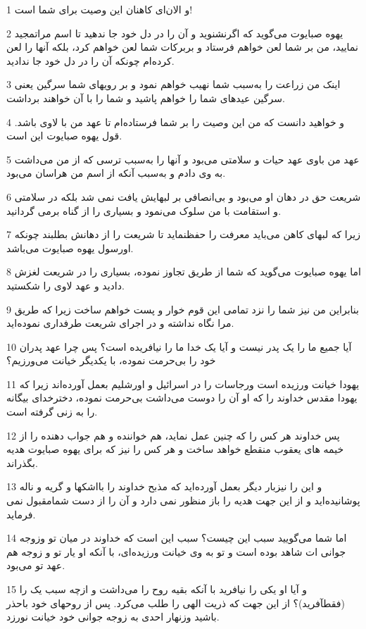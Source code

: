 \par 1 و الان‌ای کاهنان این وصیت برای شما است!
\par 2 یهوه صبایوت می‌گوید که اگرنشنوید و آن را در دل خود جا ندهید تا اسم مراتمجید نمایید، من بر شما لعن خواهم فرستاد و بربرکات شما لعن خواهم کرد، بلکه آنها را لعن کرده‌ام چونکه آن را در دل خود جا ندادید.
\par 3 اینک من زراعت را به‌سبب شما نهیب خواهم نمود و بر رویهای شما سرگین یعنی سرگین عیدهای شما را خواهم پاشید و شما را با آن خواهند برداشت.
\par 4 و خواهید دانست که من این وصیت را بر شما فرستاده‌ام تا عهد من با لاوی باشد. قول یهوه صبایوت این است.
\par 5 عهد من باوی عهد حیات و سلامتی می‌بود و آنها را به‌سبب ترسی که از من می‌داشت به وی دادم و به‌سبب آنکه از اسم من هراسان می‌بود.
\par 6 شریعت حق در دهان او می‌بود و بی‌انصافی بر لبهایش یافت نمی شد بلکه در سلامتی و استقامت با من سلوک می‌نمود و بسیاری را از گناه برمی گردانید.
\par 7 زیرا که لبهای کاهن می‌باید معرفت را حفظنماید تا شریعت را از دهانش بطلبند چونکه اورسول یهوه صبایوت می‌باشد.
\par 8 اما یهوه صبایوت می‌گوید که شما از طریق تجاوز نموده، بسیاری را در شریعت لغزش دادید و عهد لاوی را شکستید.
\par 9 بنابراین من نیز شما را نزد تمامی این قوم خوار و پست خواهم ساخت زیرا که طریق مرا نگاه نداشته و در اجرای شریعت طرفداری نموده‌اید.
\par 10 آیا جمیع ما را یک پدر نیست و آیا یک خدا ما را نیافریده است؟ پس چرا عهد پدران خود را بی‌حرمت نموده، با یکدیگر خیانت می‌ورزیم؟
\par 11 یهودا خیانت ورزیده است ورجاسات را در اسرائیل و اورشلیم بعمل آورده‌اند زیرا که یهودا مقدس خداوند را که او آن را دوست می‌داشت بی‌حرمت نموده، دخترخدای بیگانه را به زنی گرفته است.
\par 12 پس خداوند هر کس را که چنین عمل نماید، هم خواننده و هم جواب دهنده را از خیمه های یعقوب منقطع خواهد ساخت و هر کس را نیز که برای یهوه صبایوت هدیه بگذراند.
\par 13 و این را نیزبار دیگر بعمل آورده‌اید که مذبح خداوند را بااشکها و گریه و ناله پوشانیده‌اید و از این جهت هدیه را باز منظور نمی دارد و آن را از دست شمامقبول نمی فرماید.
\par 14 اما شما می‌گویید سبب این چیست؟ سبب این است که خداوند در میان تو وزوجه جوانی ات شاهد بوده است و تو به وی خیانت ورزیده‌ای، با آنکه او یار تو و زوجه هم عهد تو می‌بود.
\par 15 و آیا او یکی را نیافرید با آنکه بقیه روح را می‌داشت و ازچه سبب یک را (فقطآفرید)؟ از این جهت که ذریت الهی را طلب می‌کرد. پس از روحهای خود باحذر باشید وزنهار احدی به زوجه جوانی خود خیانت نورزد.
